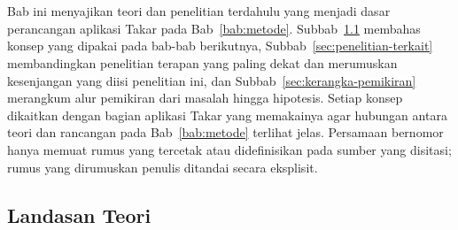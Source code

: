 \chapter{\babDua}
\label{bab:tinjauan}
\edef\babDuaRightHyphenMin{\the\righthyphenmin}


Bab ini menyajikan teori dan penelitian terdahulu yang menjadi dasar perancangan aplikasi Takar pada Bab~\ref{bab:metode}. Subbab~\ref{sec:landasan-teori} membahas konsep yang dipakai pada bab-bab berikutnya, Subbab~\ref{sec:penelitian-terkait} membandingkan penelitian terapan yang paling dekat dan merumuskan kesenjangan yang diisi penelitian ini, dan Subbab~\ref{sec:kerangka-pemikiran} merangkum alur pemikiran dari masalah hingga hipotesis. Setiap konsep dikaitkan dengan bagian aplikasi Takar yang memakainya agar hubungan antara teori dan rancangan pada Bab~\ref{bab:metode} terlihat jelas. Persamaan bernomor hanya memuat rumus yang tercetak atau didefinisikan pada sumber yang disitasi; rumus yang dirumuskan penulis ditandai secara eksplisit.

\section{Landasan Teori}
\label{sec:landasan-teori}

